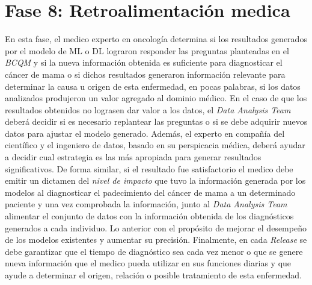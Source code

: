 \section{Fase 8: Retroalimentación medica }
En esta fase, el medico experto en oncología determina si los resultados generados por el modelo de ML o DL lograron responder las preguntas planteadas en el \textit{BCQM} y si la nueva información obtenida es suficiente para diagnosticar el cáncer de mama o si dichos resultados generaron información relevante para determinar la causa u origen de esta enfermedad, en pocas palabras, si los datos analizados produjeron un valor agregado al dominio médico. En el caso de que los resultados obtenidos no lograsen dar valor a los datos, el \textit{Data Analysis Team} deberá decidir si es necesario replantear las preguntas o si se debe adquirir nuevos datos para ajustar el modelo generado. Además, el experto en compañía del científico y el ingeniero de datos, basado en su perspicacia médica, deberá ayudar a decidir cual estrategia es las más apropiada para generar resultados significativos. De forma similar, si el resultado fue satisfactorio el medico debe emitir un dictamen del \textit{nivel de impacto} que tuvo la información generada por los modelos al diagnosticar el padecimiento del cáncer de mama a un determinado paciente y una vez comprobada la información, junto al \textit{Data Analysis Team} alimentar el conjunto de datos con la información obtenida de los diagnósticos generados a cada individuo. Lo anterior con el propósito de mejorar el desempeño de los modelos existentes y aumentar su precisión. Finalmente, en cada \textit{Release} se debe garantizar que el tiempo de diagnóstico sea cada vez menor o que se genere nueva información que el medico pueda utilizar en sus funciones diarias y que ayude a determinar el origen, relación o posible tratamiento de esta enfermedad.

